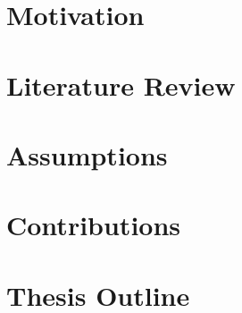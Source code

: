 
\section{Motivation}
\section{Literature Review}
\section{Assumptions}
\section{Contributions}
\section{Thesis Outline}
